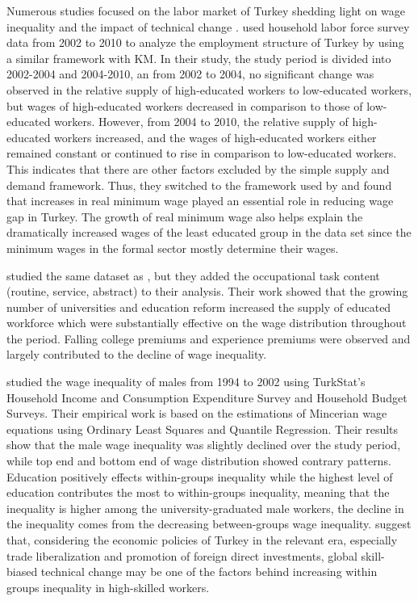 \begin{onehalfspace}
Numerous studies focused on the labor market of Turkey shedding light
on wage inequality and the impact of technical change \citep{2015Bakis,2016Popli,2011Meschi,2016Meschi,Filiztekin2020,2009Aksoy}.
\citet{2015Bakis} used household labor force survey data from 2002
to 2010 to analyze the employment structure of Turkey by using a similar
framework with KM. In their study, the study period is divided into
2002-2004 and 2004-2010, an from 2002 to 2004, no significant change
was observed in the relative supply of high-educated workers to low-educated
workers, but wages of high-educated workers decreased in comparison
to those of low-educated workers. However, from 2004 to 2010, the
relative supply of high-educated workers increased, and the wages
of high-educated workers either remained constant or continued to
rise in comparison to low-educated workers. This indicates that there
are other factors excluded by the simple supply and demand framework.
Thus, they switched to the framework used by \citet{1996DiNardo}
and found that increases in real minimum wage played an essential
role in reducing wage gap in Turkey. The growth of real minimum wage
also helps explain the dramatically increased wages of the least educated
group in the data set since the minimum wages in the formal sector
mostly determine their wages.

\citet{2016Popli} studied the same dataset as \citet{2015Bakis},
but they added the occupational task content (routine, service, abstract)
to their analysis. Their work showed that the growing number of universities
and education reform increased the supply of educated workforce which
were substantially effective on the wage distribution throughout the
period. Falling college premiums and experience premiums were observed
and largely contributed to the decline of wage inequality.

\citet{2012Tansel} studied the wage inequality of males from 1994
to 2002 using TurkStat's Household Income and Consumption Expenditure
Survey and Household Budget Surveys. Their empirical work is based
on the estimations of Mincerian wage equations using Ordinary Least
Squares and Quantile Regression. Their results show that the male
wage inequality was slightly declined over the study period, while
top end and bottom end of wage distribution showed contrary patterns.
Education positively effects within-groups inequality while the highest
level of education contributes the most to within-groups inequality,
meaning that the inequality is higher among the university-graduated
male workers, the decline in the inequality comes from the decreasing
between-groups wage inequality. \citet{2012Tansel} suggest that,
considering the economic policies of Turkey in the relevant era, especially
trade liberalization and promotion of foreign direct investments,
global skill-biased technical change may be one of the factors behind
increasing within groups inequality in high-skilled workers.


\end{onehalfspace}
